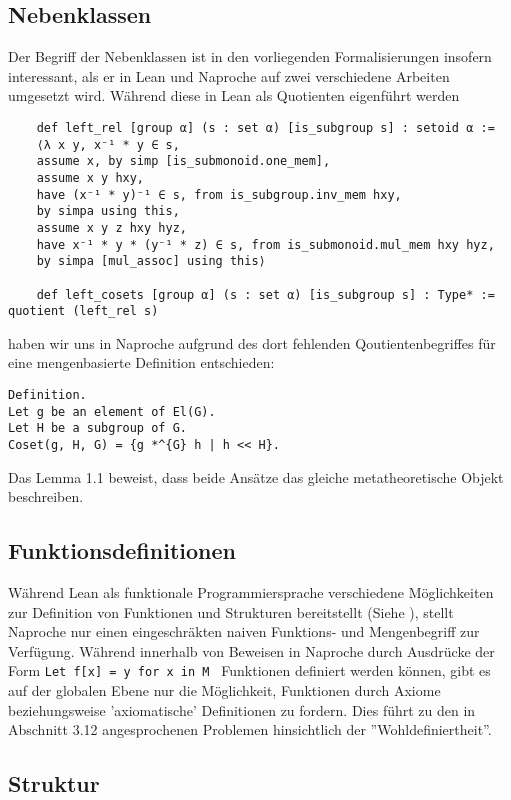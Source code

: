 \documentclass[a4paper,12pt]{scrartcl}
\begin{document}
\subsection{Nebenklassen}

Der Begriff der Nebenklassen ist in den vorliegenden Formalisierungen insofern interessant, als er in Lean und Naproche auf zwei verschiedene Arbeiten umgesetzt wird. 
Während diese in Lean als Quotienten eigenführt werden 
\lstset{language = lean}
\begin{lstlisting}
	def left_rel [group α] (s : set α) [is_subgroup s] : setoid α :=
	⟨λ x y, x⁻¹ * y ∈ s,
	assume x, by simp [is_submonoid.one_mem],
	assume x y hxy,
	have (x⁻¹ * y)⁻¹ ∈ s, from is_subgroup.inv_mem hxy,
	by simpa using this,
	assume x y z hxy hyz,
	have x⁻¹ * y * (y⁻¹ * z) ∈ s, from is_submonoid.mul_mem hxy hyz,
	by simpa [mul_assoc] using this⟩
	
	def left_cosets [group α] (s : set α) [is_subgroup s] : Type* := quotient (left_rel s)
    \end{lstlisting} haben wir uns in Naproche aufgrund des dort fehlenden Qoutientenbegriffes für eine mengenbasierte Definition entschieden:

\lstset{language = ftl}
    \begin{lstlisting}
Definition.
Let g be an element of El(G).
Let H be a subgroup of G.
Coset(g, H, G) = {g *^{G} h | h << H}.
    \end{lstlisting}

Das Lemma 1.1 beweist, dass beide Ansätze das gleiche metatheoretische Objekt beschreiben.
\subsection{Funktionsdefinitionen}

Während Lean als funktionale Programmiersprache verschiedene Möglichkeiten zur Definition von Funktionen und Strukturen bereitstellt (Siehe \cite{bibtex.e}), stellt Naproche nur einen eingeschräkten naiven Funktions- und Mengenbegriff zur Verfügung. Während innerhalb von Beweisen in Naproche durch Ausdrücke der Form \lstset{language = ftl} \lstinline{Let f[x] = y for x in M } Funktionen definiert werden können, gibt es auf der globalen Ebene nur die Möglichkeit, Funktionen durch Axiome beziehungsweise 'axiomatische' Definitionen zu fordern. Dies führt zu den in Abschnitt 3.12 angesprochenen Problemen hinsichtlich der ''Wohldefiniertheit''.

\subsection{Struktur}
\end{document}
